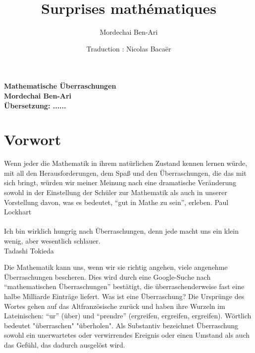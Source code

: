 
\author{Mordechai Ben-Ari}
\title{Surprises mathématiques}
\date{Traduction : Nicolas Bacaër}

\pagestyle{empty}
\begin{center}
\textbf{\huge Mathematische Überraschungen}\\
\vspace{3cm}
\textbf{\Large Mordechai Ben-Ari}\\
\vspace{1cm}
\textbf{\large Übersetzung: ......}
\end{center}



\chapter*{Vorwort}

\begin{flushright}
\parbox{7cm}{
\begin{footnotesize}
\begin{flushright}
Wenn jeder die Mathematik in ihrem natürlichen Zustand kennen lernen würde, mit all den Herausforderungen, dem Spaß und den Überraschungen, die das mit sich bringt, würden wir meiner Meinung nach eine dramatische Veränderung sowohl in der Einstellung der Schüler zur Mathematik als auch in unserer Vorstellung davon, was es bedeutet, ``gut in Mathe zu sein'', erleben.
Paul Lockhart\mbox{}\\\mbox{}\\
Ich bin wirklich hungrig nach Überraschungen, denn jede macht uns ein klein wenig, aber wesentlich schlauer.\\
Tadashi Tokieda
\end{flushright}
\end{footnotesize}
}
\end{flushright}

\bigskip

Die Mathematik kann uns, wenn wir sie richtig angehen, viele angenehme Überraschungen bescheren. Dies wird durch eine Google-Suche nach ``mathematischen Überraschungen'' bestätigt, die überraschenderweise fast eine halbe Milliarde Einträge liefert. Was ist eine Überraschung? Die Ursprünge des Wortes gehen auf das Altfranzösische zurück und haben ihre Wurzeln im Lateinischen: ``ur'' (über) und ``prendre'' (ergreifen, ergreifen, ergreifen). Wörtlich bedeutet "überraschen" "überholen". Als Substantiv bezeichnet Überraschung sowohl ein unerwartetes oder verwirrendes Ereignis oder einen Umstand als auch das Gefühl, das dadurch ausgelöst wird.


